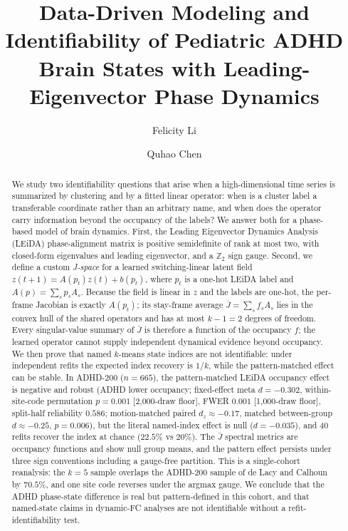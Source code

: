 \documentclass[11pt]{article}
\title{Data-Driven Modeling and Identifiability of Pediatric ADHD Brain States with Leading-Eigenvector Phase Dynamics}
\author{Felicity Li \and Quhao Chen}
\date{}
\theoremstyle{definition}
\begin{document}
\maketitle

\begin{abstract}
We study two identifiability questions that arise when a high-dimensional time series is
summarized by clustering and by a fitted linear operator: when is a cluster label a
transferable coordinate rather than an arbitrary name, and when does the operator carry
information beyond the occupancy of the labels? We answer both for a phase-based model of
brain dynamics. First, the Leading Eigenvector Dynamics Analysis (LEiDA) phase-alignment
matrix is positive semidefinite of rank at most two, with closed-form eigenvalues and
leading eigenvector, and a $\mathbb{Z}_2$ sign gauge. Second, we define a custom
\emph{J-space} for a learned switching-linear latent field
$z(t+1)=A(p_t)z(t)+b(p_t)$, where $p_t$ is a one-hot LEiDA label and
$A(p)=\sum_s p_sA_s$. Because the field is linear in $z$ and the labels are one-hot, the
per-frame Jacobian is exactly $A(p_t)$; its stay-frame average
$\bar J=\sum_s f_sA_s$ lies in the convex hull of the shared operators and has at most
$k-1=2$ degrees of freedom. Every singular-value summary of $\bar J$ is therefore a
function of the occupancy $f$; the learned operator cannot supply independent dynamical
evidence beyond occupancy. We then prove that named $k$-means state indices are not
identifiable: under independent refits the expected index recovery is $1/k$, while the
pattern-matched effect can be stable. In ADHD-200 ($n=665$), the pattern-matched LEiDA
occupancy effect is negative and robust (ADHD lower occupancy; fixed-effect meta
$d=-0.302$, within-site-code permutation $p=0.001$ [2,000-draw floor], FWER $0.001$
[1,000-draw floor], split-half reliability $0.586$; motion-matched paired
$d_z\approx-0.17$, matched between-group $d\approx-0.25$, $p=0.006$), but the literal
named-index effect is null ($d=-0.035$), and 40 refits recover the index at chance
($22.5\%$ vs $20\%$). The $\bar J$ spectral metrics are occupancy functions and show
null group means, and the pattern effect persists under three sign conventions including a gauge-free partition. This is a single-cohort reanalysis: the $k=5$ sample overlaps the ADHD-200 sample of
de Lacy and Calhoun by $70.5\%$, and one site code reverses under the argmax gauge. We conclude that the ADHD
phase-state difference is real but pattern-defined in this cohort, and that named-state
claims in dynamic-FC analyses are not identifiable without a refit-identifiability test.
\end{abstract}
\end{document}
